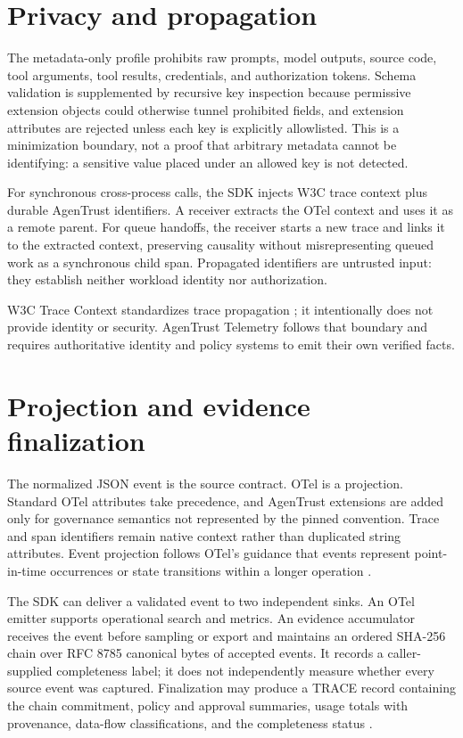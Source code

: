\documentclass[10pt,letterpaper]{article}
\begin{document}
\section{Privacy and propagation}

The metadata-only profile prohibits raw prompts, model outputs, source code, tool arguments, tool results, credentials, and authorization tokens. Schema validation is supplemented by recursive key inspection because permissive extension objects could otherwise tunnel prohibited fields, and extension attributes are rejected unless each key is explicitly allowlisted. This is a minimization boundary, not a proof that arbitrary metadata cannot be identifying: a sensitive value placed under an allowed key is not detected.

For synchronous cross-process calls, the SDK injects W3C trace context plus durable AgenTrust identifiers. A receiver extracts the OTel context and uses it as a remote parent. For queue handoffs, the receiver starts a new trace and links it to the extracted context, preserving causality without misrepresenting queued work as a synchronous child span. Propagated identifiers are untrusted input: they establish neither workload identity nor authorization.

W3C Trace Context standardizes trace propagation \citep{tracecontext}; it intentionally does not provide identity or security. AgenTrust Telemetry follows that boundary and requires authoritative identity and policy systems to emit their own verified facts.

\section{Projection and evidence finalization}

The normalized JSON event is the source contract. OTel is a projection. Standard OTel attributes take precedence, and AgenTrust extensions are added only for governance semantics not represented by the pinned convention. Trace and span identifiers remain native context rather than duplicated string attributes. Event projection follows OTel's guidance that events represent point-in-time occurrences or state transitions within a longer operation \citep{otelevents}.

The SDK can deliver a validated event to two independent sinks. An OTel emitter supports operational search and metrics. An evidence accumulator receives the event before sampling or export and maintains an ordered SHA-256 chain over RFC 8785 canonical bytes of accepted events. It records a caller-supplied completeness label; it does not independently measure whether every source event was captured. Finalization may produce a TRACE record containing the chain commitment, policy and approval summaries, usage totals with provenance, data-flow classifications, and the completeness status \citep{tracepaper}.
\end{document}

